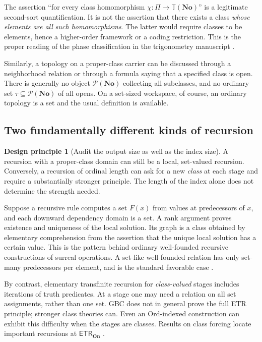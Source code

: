 \documentclass[11pt,letterpaper]{article}
\numberwithin{equation}{section}
\theoremstyle{definition}
\newtheorem{principle}[theorem]{Design principle}
\theoremstyle{remark}
\newcommand{\No}{\mathbf{No}}
\newcommand{\On}{\mathbf{On}}
\newcommand{\ETR}{\mathsf{ETR}}
\begin{document}
The assertion ``for every class homomorphism $\chi:\Pi\to\mathbb T(\No)$'' is a legitimate second-sort quantification. It is not the assertion that there exists a class \emph{whose elements are all such homomorphisms}. The latter would require classes to be elements, hence a higher-order framework or a coding restriction. This is the proper reading of the phase classification in the trigonometry manuscript \cite[\S16.1]{TrigSource}.

Similarly, a topology on a proper-class carrier can be discussed through a neighborhood relation or through a formula saying that a specified class is open. There is generally no object $\mathcal P(\No)$ collecting all subclasses, and no ordinary set $\tau\subseteq\mathcal P(\No)$ of all opens. On a set-sized workspace, of course, an ordinary topology is a set and the usual definition is available.

\subsection{Two fundamentally different kinds of recursion}
\begin{principle}[Audit the output size as well as the index size]\label{prin:recursion}
A recursion with a proper-class domain can still be a local, set-valued recursion. Conversely, a recursion of ordinal length can ask for a new \emph{class} at each stage and require a substantially stronger principle. The length of the index alone does not determine the strength needed.
\end{principle}

Suppose a recursive rule computes a set $F(x)$ from values at predecessors of $x$, and each downward dependency domain is a set. A rank argument proves existence and uniqueness of the local solution. Its graph is a class obtained by elementary comprehension from the assertion that the unique local solution has a certain value. This is the pattern behind ordinary well-founded recursive constructions of surreal operations. A set-like well-founded relation has only set-many predecessors per element, and is the standard favorable case \cite{HamkinsRecursion}.

By contrast, elementary transfinite recursion for \emph{class-valued} stages includes iterations of truth predicates. At a stage one may need a relation on all set assignments, rather than one set. GBC does not in general prove the full ETR principle; stronger class theories can. Even an Ord-indexed construction can exhibit this difficulty when the stages are classes. Results on class forcing locate important recursions at $\ETR_{\On}$ \cite{ClassForcing}.
\end{document}
